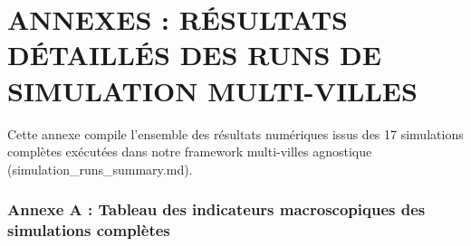 \documentclass[10pt, a4paper]{article}
\begin{document}
\newpage

\section{ANNEXES : RÉSULTATS DÉTAILLÉS DES RUNS DE SIMULATION
MULTI-VILLES}\label{annexes-ruxe9sultats-duxe9tailluxe9s-des-runs-de-simulation-multi-villes}

Cette annexe compile l'ensemble des résultats numériques issus des 17
simulations complètes exécutées dans notre framework multi-villes
agnostique (simulation\_runs\_summary.md).

\subsubsection{Annexe A : Tableau des indicateurs macroscopiques des
simulations
complètes}\label{annexe-a-tableau-des-indicateurs-macroscopiques-des-simulations-compluxe8tes}
\end{document}
